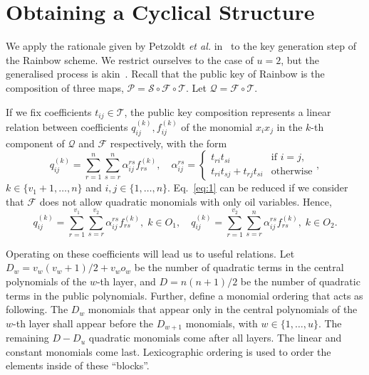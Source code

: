 \documentclass[12pt]{article}
\begin{document}
\section{Obtaining a Cyclical Structure}\label{sec:cyclic}

We apply the rationale given by Petzoldt \emph{et al.} in~\cite{Petzoldt:inproc:2010:jun} to the key generation step of the Rainbow scheme. We restrict ourselves to the case of $u = 2$, but the generalised process is akin~\cite[Section 7.2]{Petzoldt:phd:2013:jul}. Recall that the public key of Rainbow is the composition of three maps, $\mathcal{P} = \mathcal{S} \circ \mathcal{F} \circ \mathcal{T}$. Let $\mathcal{Q} = \mathcal{F} \circ \mathcal{T}$. 

If we fix coefficients $t_{ij} \in \mathcal{T}$, the public key composition represents a linear relation between coefficients $q_{ij}^{(k)}, f_{ij}^{(k)}$ of the monomial $x_{i} x_{j}$ in the $k$-th component of $\mathcal{Q}$ and $\mathcal{F}$ respectively, with the form
\begin{equation}\label{eq:1}
q_{ij}^{(k)} = \sum_{r = 1}^{n} \sum_{s = r}^{n} \alpha_{ij}^{rs} f_{rs}^{(k)}, \quad \alpha_{ij}^{rs} =
\begin{cases}
t_{ri} t_{si}                   & \text{if } i = j, \\
t_{ri} t_{sj} + t_{rj} t_{si}   & \text{otherwise}
\end{cases},
\end{equation}
$k \in \{v_{1} + 1, \dots, n\}$ and $i, j \in \{1, \dots, n\}$. Eq.~\ref{eq:1} can be reduced if we consider that $\mathcal{F}$ does not allow quadratic monomials with only oil variables. Hence,
\begin{equation}\label{eq:2}
    q_{ij}^{(k)} = \sum_{r = 1}^{v_{1}} \sum_{s = r}^{v_{2}} \alpha_{ij}^{rs} f_{rs}^{(k)}, \; k \in O_{1}, \quad    q_{ij}^{(k)} = \sum_{r = 1}^{v_{2}} \sum_{s = r}^{n} \alpha_{ij}^{rs} f_{rs}^{(k)}, \; k \in O_{2}.
\end{equation}

Operating on these coefficients will lead us to useful relations. Let $D_{w} = v_{w}(v_{w} + 1)/2 + v_{w} o_{w}$ be the number of quadratic terms in the central polynomials of the $w$-th layer, and $D = n(n + 1)/2$ be the number of quadratic terms in the public polynomials. Further, define a monomial ordering that acts as following. The $D_{w}$ monomials that appear only in the central polynomials of the $w$-th layer shall appear before the $D_{w + 1}$ monomials, with $w \in \{1, \dots, u\}$. The remaining $D - D_{u}$ quadratic monomials come after all layers. The linear and constant monomials come last. Lexicographic ordering is used to order the elements inside of these ``blocks''.
\end{document}
